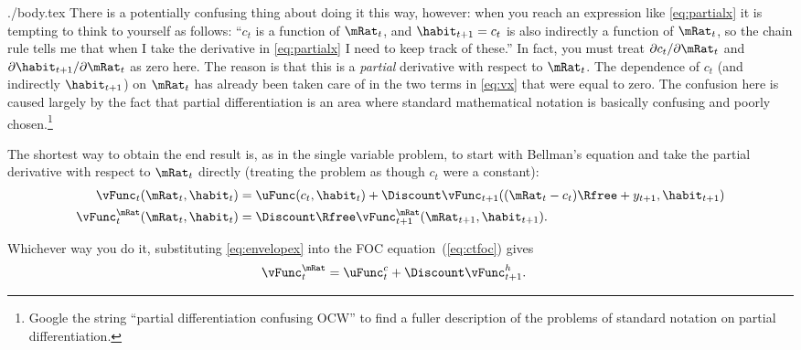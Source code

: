 \documentclass{handout}
\begin{document}
\begin{verbatimwrite}{./body.tex}
There is a potentially confusing thing about doing it this way,
however: when you reach an expression like \eqref{eq:partialx} it is
tempting to think to yourself as follows: ``$c_{t}$ is a function of
$\mRat_{t}$, and $\habit_{t+1}=c_{t}$ is also indirectly a function of $\mRat_{t}$,
so the chain rule tells me that when I take the derivative in
\eqref{eq:partialx} I need to keep track of these.''  In fact, you
must treat $\partial c_{t}/\partial \mRat_{t}$ and $\partial
\habit_{t+1}/\partial \mRat_{t}$ as zero here.  The reason is that this is a
{\it partial} derivative with respect to $\mRat_{t}$.  The dependence of
$c_{t}$ (and indirectly $\habit_{t+1}$) on $\mRat_{t}$ has already been taken
care of in the two terms in \eqref{eq:vx} that were equal to zero. 
The confusion here is caused largely by the fact that partial
differentiation is an area where standard mathematical notation is
basically confusing and poorly chosen.\footnote{Google the string ``partial differentiation confusing OCW'' to find a fuller description of the problems of standard notation on partial differentiation.}

The shortest way to obtain the end result is, as in the single
variable problem, to start with Bellman's equation and take the
partial derivative with respect to $\mRat_{t}$ directly (treating the
problem as though $c_{t}$ were a constant):
\begin{equation}\begin{gathered}\begin{aligned}
        \vFunc_{t}(\mRat_{t},\habit_{t}) & =  \uFunc(c_{t},\habit_{t})+\Discount \vFunc_{t+1}((\mRat_{t}-c_{t})\Rfree+y_{t+1},\habit_{t+1})  \\
        \vFunc_{t}^{\mRat}(\mRat_{t},\habit_{t}) & =  \Discount \Rfree \vFunc_{t+1}^{\mRat}(\mRat_{t+1},\habit_{t+1}).
\end{aligned}\end{gathered}\end{equation}

Whichever way you do it, substituting \eqref{eq:envelopex} into the
FOC equation~(\ref{eq:ctfoc}) gives
\begin{equation}\begin{gathered}\begin{aligned}
\vFunc_{t}^{\mRat} & =  \uFunc^{c}_{t}+\Discount \vFunc_{t+1}^{h}. \label{eq:ctfocsubx}
\end{aligned}\end{gathered}\end{equation}


\end{verbatimwrite}
\end{document}
